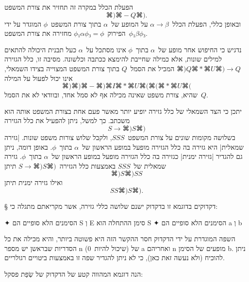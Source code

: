 הפעלת הכלל
במקרה זה תחזיר את צורת המשפט
\begin{equation*}
  ⌘)⌘-Q⌘).
\end{equation*}
ובאופן כללי, הפעלת הכלל~$α→β$ על המופע של~$α$ בתוך צורת המשפט~$ϕ$ המוגדר על ידי
הפירוק~$ϕ₁αϕ₃=ϕ$ מחזירה את צורת המשפט~$ϕ₁βϕ₃$.

נדגיש כי החיפוש אחר מופע של~$α$ בתוך~$ϕ$ אינו מסתכל על~$α$ כעל תבנית היכולה
להתאים למילים שונות, אלא כמילה שחייבת להימצא ככתבה וכלשונה. מסיבה זו, כלל
הגזירה
$⌘)Q⌘*⌘U⌘)→Q$ המכיל את הסמל~$Q$ בתוך צורת המשפט המצוייה בצידו השמאלי,
אינו יכול לפעול על המילה
\begin{equation*}
  ⌘)⌘)⌘-⌘)⌘I⌘*⌘U ⌘(⌘(⌘*⌘U⌘(
\end{equation*}
שהיא, צורת משפט שאינה מכילה אף לא סמל אחד, ובוודאי לא את הסמל~$Q$.

יתכן כי הצד השמאלי של כלל גזירה יופיע יותר מאשר פעם אחת בצורת
המשפט אותה הוא משכתב. כך למשל, ניתן להפעיל את כלל הגזירה
\begin{equation}
  \label{eq:parenthesis:rewrite}
  S→⌘) S ⌘)
\end{equation}
בשלושה מקומות שונים על צורת המשפט~$SSS$, ולקבל שלוש צורות משפט שונות.
\ע|גזירה שמאלית| היא גזירה בה כלל הגזירה מופעל במופע הראשון של~$α$ בתוך~$ϕ$.
באופן דומה, ניתן גם להגדיר \ע|גזירה ימנית| כגזירה בה כלל הגזירה מופעל במופע
הראשון של~$α$ בתוך~$ϕ$. גזירה שמאלית של~$SSS$ באמצעות כלל הגזירה~$S→⌘)S⌘)$ תיתן
\begin{equation*}
  ⌘)S⌘)SS
\end{equation*}
ואילו גזירה ימנית תיתן
\begin{equation*}
  SS ⌘) S ⌘).
\end{equation*}

§ דקדוקים
בדוגמא זו בדקדוק ישנם שלושה כללי גזירה, אשר מקריאתם מתגלה כי:
\begin{enumerate}
  ✦
  הסימנים הלא סופיים הם S וְ E
  סימן ההתחלה הוא S
  ✦
  הסימנים הלא סופיים הם a וְ b
\end{enumerate}

השפה המוגדרת על ידי הדקדוק חסר ההקשר הזה היא פשוטה ביותר, והיא מכילה את
כל הסדריות שבראשן יש מספר n (שיכול להיות~0) של a ואחריהם n מופעים של
הסימן b.
ניתן להוכיח (ולא נעשה זאת כאן), כי לא ניתן להגדיר שפה זו באמצעות ביטויים
רגולריים.

הנה דוגמא המהווה קטע של הדקדוק של שְׂפַת פסקל:

